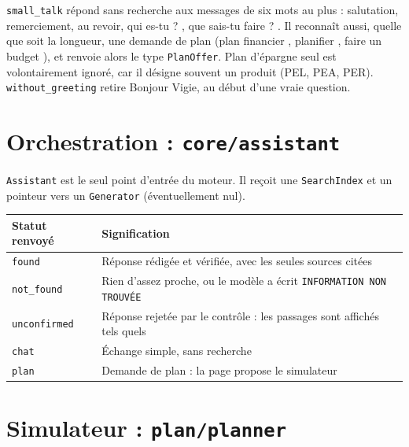 \documentclass[11pt,a4paper]{article}
\newcommand{\fichier}[1]{\texttt{#1}}
\begin{document}
\texttt{small\_talk} répond sans recherche aux messages de six mots au plus : salutation, remerciement, au revoir, \og qui es-tu ? \fg, \og que sais-tu faire ? \fg. Il reconnaît aussi, quelle que soit la longueur, une demande de plan (\og plan financier \fg, \og planifier \fg, \og faire un budget \fg), et renvoie alors le type \texttt{PlanOffer}. \og Plan d'épargne \fg{} seul est volontairement ignoré, car il désigne souvent un produit (PEL, PEA, PER). \texttt{without\_greeting} retire \og Bonjour Vigie, \fg{} au début d'une vraie question.

\section{Orchestration : \texttt{core/assistant}}

\texttt{Assistant} est le seul point d'entrée du moteur. Il reçoit une \texttt{SearchIndex} et un pointeur vers un \texttt{Generator} (éventuellement nul).





\begin{center}
\small
\begin{tabularx}{\linewidth}{@{}l X@{}}
\toprule
Statut renvoyé & Signification \\
\midrule
\texttt{found} & Réponse rédigée et vérifiée, avec les seules sources citées \\
\texttt{not\_found} & Rien d'assez proche, ou le modèle a écrit \texttt{INFORMATION NON TROUVÉE} \\
\texttt{unconfirmed} & Réponse rejetée par le contrôle : les passages sont affichés tels quels \\
\texttt{chat} & Échange simple, sans recherche \\
\texttt{plan} & Demande de plan : la page propose le simulateur \\
\bottomrule
\end{tabularx}
\end{center}

\section{Simulateur : \texttt{plan/planner}}
\end{document}
